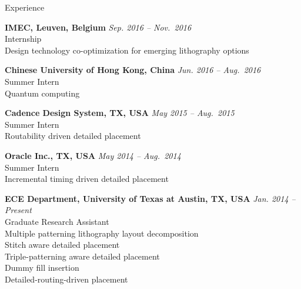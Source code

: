 
\begin{rSection}{Experience}

{\bf IMEC, Leuven, Belgium}                           \hfill {\em Sep. 2016 -- Nov.~2016} \\
Internship \\
Design technology co-optimization for emerging lithography options

{\bf Chinese University of Hong Kong, China}                           \hfill {\em Jun. 2016 -- Aug.~2016} \\
Summer Intern \\
Quantum computing

{\bf Cadence Design System, TX, USA}                           \hfill {\em May 2015 -- Aug.~2015} \\
Summer Intern \\
Routability driven detailed placement

{\bf Oracle Inc., TX, USA}                           \hfill {\em May 2014 -- Aug.~2014} \\
Summer Intern \\
Incremental timing driven detailed placement

{\bf ECE Department, University of Texas at Austin, TX, USA}  \hfill {\em Jan. 2014 -- Present} \\
Graduate Research Assistant \\
Multiple patterning lithography layout decomposition \\ %
Stitch aware detailed placement \\ %
Triple-patterning aware detailed placement \\ %
Dummy fill insertion \\ %
Detailed-routing-driven placement  %

\end{rSection}



